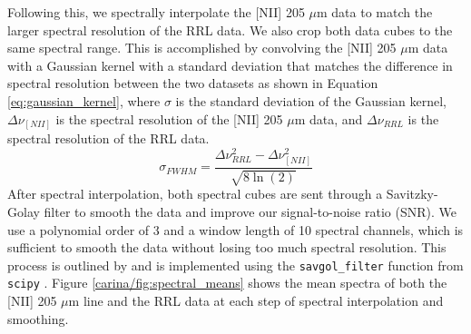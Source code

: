 Following this, we spectrally interpolate the [NII] 205 $\mu$m data to match the larger spectral resolution of the RRL data.
We also crop both data cubes to the same spectral range. 
This is accomplished by convolving the [NII] 205 $\mu$m data with a Gaussian kernel with a standard deviation that matches the difference in spectral resolution between the two datasets as shown in Equation \ref{eq:gaussian_kernel}, where $\sigma$ is the standard deviation of the Gaussian kernel, $\Delta \nu_{[NII]}$ is the spectral resolution of the [NII] 205 $\mu$m data, and $\Delta \nu_{RRL}$ is the spectral resolution of the RRL data.
\begin{equation}
    \sigma_{FWHM} = \frac{\Delta \nu_{RRL}^2 - \Delta \nu_{[NII]}^2}{\sqrt{8\ln(2)}}
    \label{eq:gaussian_kernel}
\end{equation}
After spectral interpolation, both spectral cubes are sent through a Savitzky-Golay filter to smooth the data and improve our signal-to-noise ratio (SNR). 
We use a polynomial order of 3 and a window length of 10 spectral channels, which is sufficient to smooth the data without losing too much spectral resolution. 
This process is outlined by \cite{pineda2019electron} and is implemented using the \texttt{savgol\_filter} function from \texttt{scipy} \parencite{2020SciPy-NMeth}.
Figure \ref{carina/fig:spectral_means} shows the mean spectra of both the [NII] 205 $\mu$m line and the RRL data at each step of spectral interpolation and smoothing.

